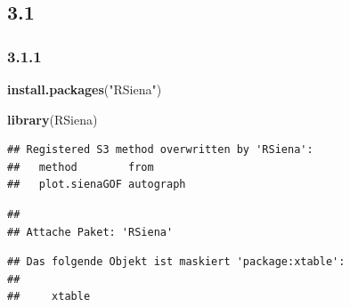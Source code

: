 \documentclass[
]{article}
\newenvironment{Shaded}{\begin{snugshade}}{\end{snugshade}}
\newcommand{\FunctionTok}[1]{\textcolor[rgb]{0.13,0.29,0.53}{\textbf{#1}}}
\newcommand{\NormalTok}[1]{#1}
\newcommand{\StringTok}[1]{\textcolor[rgb]{0.31,0.60,0.02}{#1}}
\begin{document}
\subsection{3.1}\label{section-9}

\subsubsection{3.1.1}\label{section-10}

\begin{Shaded}
\begin{Highlighting}[]
\FunctionTok{install.packages}\NormalTok{(}\StringTok{"RSiena"}\NormalTok{)}
\end{Highlighting}
\end{Shaded}

\begin{Shaded}
\begin{Highlighting}[]
\FunctionTok{library}\NormalTok{(RSiena)}
\end{Highlighting}
\end{Shaded}

\begin{verbatim}
## Registered S3 method overwritten by 'RSiena':
##   method        from     
##   plot.sienaGOF autograph
\end{verbatim}

\begin{verbatim}
## 
## Attache Paket: 'RSiena'
\end{verbatim}

\begin{verbatim}
## Das folgende Objekt ist maskiert 'package:xtable':
## 
##     xtable
\end{verbatim}
\end{document}
